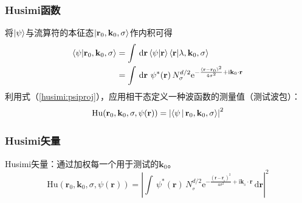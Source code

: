 \documentclass[UTF8]{beamer}
\begin{document}
\begin{frame}
	\frametitle{Husimi函数}
	将$\ket{\psi}$与流算符的本征态$\ket{\mathbf{r}_0,\mathbf{k}_0,\sigma}$作内积可得
	\begin{align}
		\braket{\mathbf{\psi}|\mathbf{r}_0,\mathbf{k}_0,\sigma} & = \int \,\mathrm{d}\mathbf{r}\braket{\mathbf{\psi}|\mathbf{r}}\braket{\mathbf{r}|\lambda,\mathbf{k}_0,\sigma}                                                          \\
		                                                        & = \int \,\mathrm{d}\mathbf{r}\ \psi^{*}(\mathbf{r})\,N_{\sigma}^{d/2}\mathrm{e}^{-\frac{(\mathbf{r}-\mathbf{r}_0)^2}{4\sigma^2}+\mathrm{i}\mathbf{k}_0\cdot\mathbf{r}}
		\label{husimi:psiproj}
	\end{align}
	利用式（\ref{husimi:psiproj}），应用相干态定义一种波函数的测量值（测试波包）：
	\begin{equation}
		\mathrm{Hu}(\mathbf{r}_0,\mathbf{k}_0, \sigma,\psi(\mathbf{r}))=\left\lvert\Braket{\mathbf{\psi}|\mathbf{r}_0,\mathbf{k}_0,\sigma}\right\rvert^2
		\label{husimi:function}
	\end{equation}
\end{frame}
\begin{frame}
	\frametitle{Husimi矢量}
	Husimi矢量：通过加权每一个用于测试的$\mathbf{k}_0$。
	\begin{equation*}
		\mathrm{Hu}(\mathbf{r}_0,\mathbf{k}_0, \sigma,\psi(\mathbf{r}))= \left\lvert \int \,\psi^{*}(\mathbf{r})\,N_{_\sigma}^{d/2}\mathrm{e}^{-\frac{(\mathbf{r}-\mathbf{r}_{_0})^2}{4\sigma^2}+\mathrm{i}\mathbf{k}_{_0}\cdot\mathbf{r}} \,\mathrm{d}\mathbf{r} \right\rvert^2
	\end{equation*}
	\begin{figure}
		\centering
	\end{figure}
\end{frame}
\end{document}
